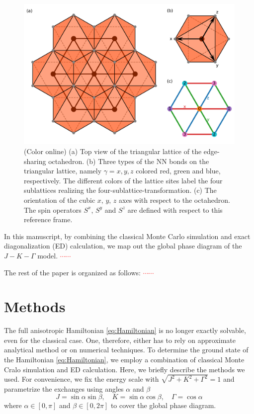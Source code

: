 \documentclass[aps,prb,reprint,groupedaddress,showpacs,amsfonts,amsmath,amssymb,superscriptaddress]{revtex4-1}
\begin{document}
\begin{figure}
    \includegraphics[width=\columnwidth]{Fig1.pdf}
    \caption{(Color online) (a) Top view of the triangular lattice of the edge-sharing octahedron. (b) Three types of the NN bonds on the triangular lattice, namely $\gamma=x, y, z$ colored red, green and blue, respectively. The different colors of the lattice sites label the four sublattices realizing the four-sublattice-transformation. (c) The orientation of the cubic $x$, $y$, $z$ axes with respect to the octahedron. The spin operators $S^x$, $S^y$ and $S^z$ are defined with respect to this reference frame.}
    \label{fig:ModelDefinition}
\end{figure}

In this manuscript, by combining the classical Monte Carlo simulation and exact diagonalization (ED) calculation, we map out the global phase diagram of the $J-K-\Gamma$ model. \textcolor{red}{$\cdots\cdots$}

The rest of the paper is organized as follows: \textcolor{red}{$\cdots\cdots$}

\section{Methods}
The full anisotropic Hamiltonian \eqref{eq:Hamiltonian} is no longer exactly solvable, even for the classical case. One, therefore, either has to rely on approximate analytical method or on numerical techniques. To determine the ground state of the Hamiltonian \eqref{eq:Hamiltonian}, we employ a combination of classical Monte Cralo simulation and ED calculation. Here, we briefly describe the methods we used. For convenience, we fix the energy scale with $\sqrt{J^2 + K^2 + \Gamma^2}=1$ and parametrize the exchanges using angles $\alpha$ and $\beta$
\begin{equation}
    J=\sin\alpha \sin\beta, \quad K=\sin\alpha \cos\beta, \quad \Gamma=\cos\alpha
    \label{eq:Parameters}
\end{equation}
where $\alpha \in [0, \pi]$ and $\beta \in [0, 2\pi]$ to cover the global phase diagram.
\end{document}
